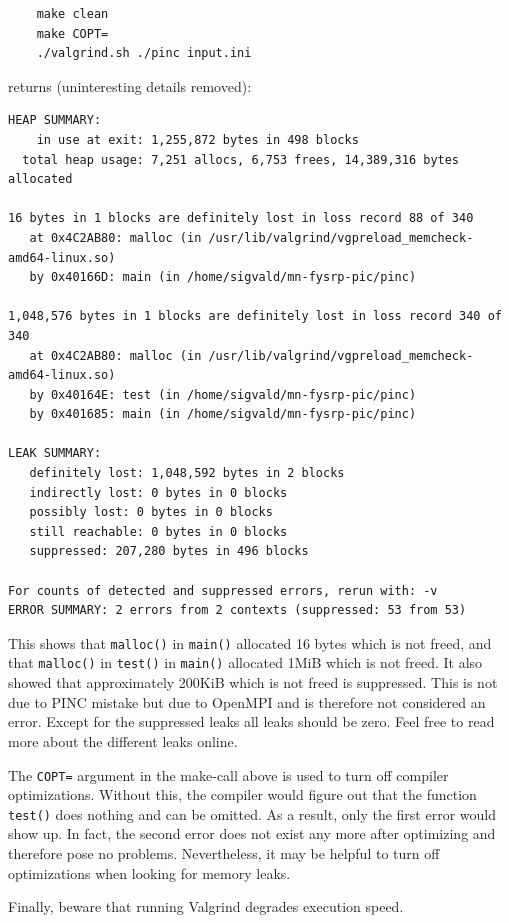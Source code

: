 \documentclass[10pt,a4paper]{article}
\begin{document}
\begin{verbatim}
	make clean
	make COPT=
	./valgrind.sh ./pinc input.ini
\end{verbatim}
returns (uninteresting details removed):

\begin{verbatim}
HEAP SUMMARY:
    in use at exit: 1,255,872 bytes in 498 blocks
  total heap usage: 7,251 allocs, 6,753 frees, 14,389,316 bytes allocated

16 bytes in 1 blocks are definitely lost in loss record 88 of 340
   at 0x4C2AB80: malloc (in /usr/lib/valgrind/vgpreload_memcheck-amd64-linux.so)
   by 0x40166D: main (in /home/sigvald/mn-fysrp-pic/pinc)

1,048,576 bytes in 1 blocks are definitely lost in loss record 340 of 340
   at 0x4C2AB80: malloc (in /usr/lib/valgrind/vgpreload_memcheck-amd64-linux.so)
   by 0x40164E: test (in /home/sigvald/mn-fysrp-pic/pinc)
   by 0x401685: main (in /home/sigvald/mn-fysrp-pic/pinc)

LEAK SUMMARY:
   definitely lost: 1,048,592 bytes in 2 blocks
   indirectly lost: 0 bytes in 0 blocks
   possibly lost: 0 bytes in 0 blocks
   still reachable: 0 bytes in 0 blocks
   suppressed: 207,280 bytes in 496 blocks

For counts of detected and suppressed errors, rerun with: -v
ERROR SUMMARY: 2 errors from 2 contexts (suppressed: 53 from 53)
\end{verbatim}

This shows that \lstinline$malloc()$ in \lstinline$main()$ allocated 16 bytes which is not freed, and that \lstinline$malloc()$ in \lstinline$test()$ in \lstinline$main()$ allocated 1MiB which is not freed. It also showed that approximately 200KiB which is not freed is suppressed. This is not due to PINC mistake but due to OpenMPI and is therefore not considered an error. Except for the suppressed leaks all leaks should be zero. Feel free to read more about the different leaks online.

The \verb$COPT=$ argument in the make-call above is used to turn off compiler optimizations. Without this, the compiler would figure out that the function \lstinline$test()$ does nothing and can be omitted. As a result, only the first error would show up. In fact, the second error does not exist any more after optimizing and therefore pose no problems. Nevertheless, it may be helpful to turn off optimizations when looking for memory leaks.

Finally, beware that running Valgrind degrades execution speed.
\end{document}
